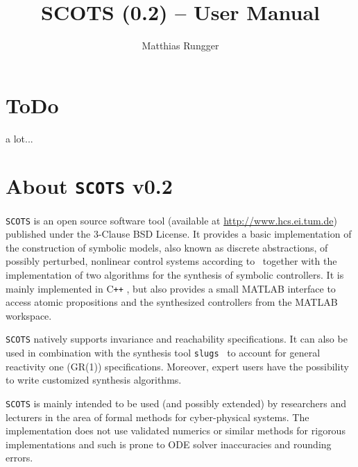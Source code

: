 \documentclass[a4paper]{amsart}
\title{SCOTS (0.2) -- User Manual}
\author{Matthias Rungger}
\newcommand\Cpp{C\texttt{++} }
\begin{document}
  \maketitle

	\tableofcontents
	\newpage
	

\section{ToDo}

{\color{red} a lot...}

\newpage


\section{About {\tt SCOTS} v0.2}

{\tt SCOTS} is an open source software tool (available at
\mbox{\url{http://www.hcs.ei.tum.de}}) published under the 3-Clause BSD License. It
provides a basic implementation of the construction of symbolic models, also
known as discrete abstractions, of possibly perturbed, nonlinear control systems
according to~\cite{ReissigWeberRungger15} together with the implementation of
two algorithms for the synthesis of symbolic controllers. It is mainly implemented
in \Cpp, but also provides a small MATLAB interface to access atomic propositions
and the synthesized controllers from the MATLAB workspace.

{\tt SCOTS} natively supports invariance and reachability
specifications. 
It can also be used in
combination with the synthesis tool {\tt slugs}~\cite{EhlersRaman16} to account for
general reactivity one (GR(1)) specifications. Moreover, expert users have the
possibility to write customized synthesis algorithms.

{\tt SCOTS} is mainly intended to be used (and possibly extended) by researchers and
lecturers in the area of formal methods for
cyber-physical systems. The implementation does not use validated numerics or similar
methods for rigorous implementations and such is prone to ODE solver
inaccuracies and rounding errors.
\end{document}
